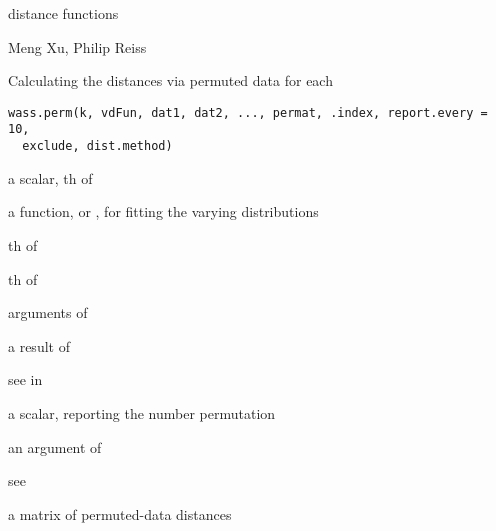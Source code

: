 \documentclass[a4paper]{book}
\begin{document}
%
\begin{Value}
distance functions
\end{Value}
%
\begin{Author}\relax
Meng Xu, Philip Reiss
\end{Author}
%
\begin{Description}\relax
Calculating the distances via permuted data for each 
\end{Description}
%
\begin{Usage}
\begin{verbatim}
wass.perm(k, vdFun, dat1, dat2, ..., permat, .index, report.every = 10,
  exclude, dist.method)
\end{verbatim}
\end{Usage}
%
\begin{Arguments}
\begin{ldescription}
\item[\code{k}] a scalar, th  of 

\item[\code{vdFun}] a function,  or , for fitting the varying distributions

\item[\code{dat1}] th  of 

\item[\code{dat2}] th  of 

\item[\code{...}] arguments of 

\item[\code{permat}] a result of 

\item[\code{.index}] see  in 

\item[\code{report.every}] a scalar, reporting the number permutation

\item[\code{exclude}] an argument of 

\item[\code{dist.method}] see 
\end{ldescription}
\end{Arguments}
%
\begin{Value}
a matrix of permuted-data distances
\end{Value}
\end{document}
